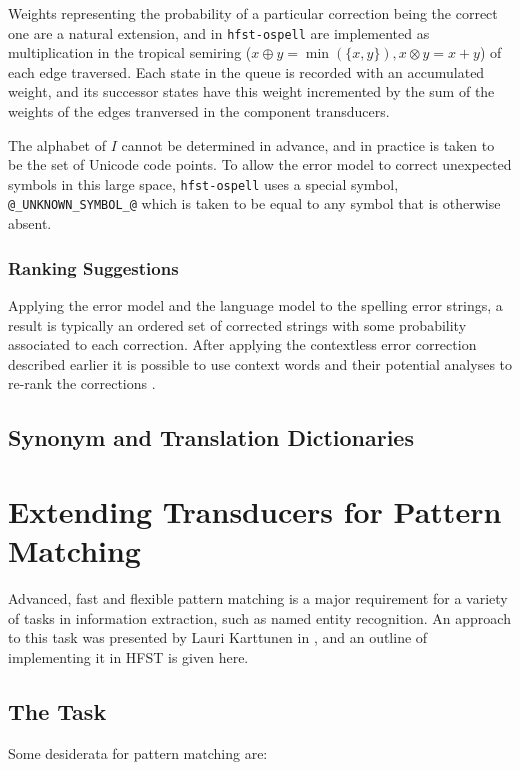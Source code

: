 \documentclass{llncs}
\begin{document}
Weights representing the probability of a particular correction being the
correct one are a natural extension, and in \verb!hfst-ospell! are implemented
as multiplication in the tropical semiring
($x \oplus y = \min(\{x, y\}), x \otimes y = x + y$) of each edge traversed.
Each state in the queue is recorded with an accumulated weight, and its
successor states have this weight incremented by the sum of the weights of
the edges tranversed in the component transducers.

The alphabet of $I$ cannot be determined in advance, and in practice is taken
to be the set of Unicode code points. To allow the error model to correct
unexpected symbols in this large space, \verb!hfst-ospell! uses a special
symbol, \verb!@_UNKNOWN_SYMBOL_@! which is taken to be equal to any symbol
that is otherwise absent.

\subsubsection{Ranking Suggestions}

Applying the error model and the language model to the spelling error strings,
a result is typically an ordered set of corrected strings with some probability
associated to each correction. After applying the contextless error correction
described earlier it is possible to use context words and their potential
analyses to re-rank the corrections \cite{pirinen/cicling/2012}.

\subsection{Synonym and Translation Dictionaries}

\section{Extending Transducers for Pattern Matching}
Advanced, fast and flexible pattern matching is a major requirement for a
variety of tasks in information extraction, such as named entity recognition.
An approach to this task was presented by Lauri Karttunen in
\cite{karttunen2011}, and an outline of implementing it in HFST is given here.

\subsection{The Task}

Some desiderata for pattern matching are:
\end{document}
